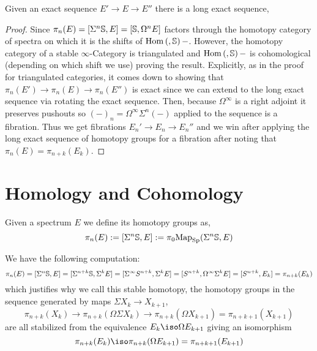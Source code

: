 \documentclass[12pt]{extarticle}
\begin{document}
\begin{prop}
Given an exact sequence $E' \to E \to E''$ there is a long exact sequence,
\begin{center}
\end{center} 
\end{prop}

\begin{proof}
Since $\pi_n(E) = [\Sigma^n \S, E] = [\S, \Omega^n E]$ factors through the homotopy category of spectra on which it is the shifts of $\Hom{}{\S}{-}$. However, the homotopy category of a stable $\infty$-Category is triangulated and $\Hom{}{\S}{-}$ is cohomological (depending on which shift we use) proving the result. Explicitly, as in the proof for triangulated categories, it comes down to showing that $\pi_n(E') \to \pi_n(E) \to \pi_n(E'')$ is exact since we can extend to the long exact sequence via rotating the exact sequence. Then, because $\Omega^\infty$ is a right adjoint it preserves pushouts so $(-)_n = \Omega^{\infty} \Sigma^n(-)$ applied to the sequence is a fibration. Thus we get fibrations $E_{n}' \to E_{n} \to E_{n}''$ and we win after applying the long exact sequence of homotopy groups for a fibration after noting that $\pi_n(E) = \pi_{n+k}(E_{k})$.
\end{proof}

\section{Homology and Cohomology}

\begin{defn}
Given a spectrum $E$ we define its homotopy groups as,
\[ \pi_n(E) := [\Sigma^n \S, E] := \pi_0 \mathrm{Map}_{\mathrm{Sp}}(\Sigma^n \S, E) \]
\end{defn}

\begin{rmk}
We have the following computation:
\[ \pi_n(E) = [\Sigma^n \S, E] = [\Sigma^{n+k} \S, \Sigma^k E] = [\Sigma^\infty S^{n+k}, \Sigma^k E] = [S^{n+k}, \Omega^\infty \Sigma^k E] = [S^{n+k}, E_k] = \pi_{n+k}(E_k) \]
which justifies why we call this stable homotopy, the homotopy groups in the sequence generated by maps $\Sigma X_k \to X_{k+1}$,
\[ \pi_{n+k}(X_k) \to \pi_{n+k}(\Omega \Sigma X_{k}) \to \pi_{n+k}(\Omega X_{k+1}) = \pi_{n+k+1}(X_{k+1}) \]
are all stabilized from the equivalence $E_{k} \iso \Omega E_{k+1}$ giving an isomorphism
\[ \pi_{n+k}(E_k) \iso \pi_{n+k}(\Omega E_{k+1}) = \pi_{n+k+1}(E_{k+1}) \]
\end{rmk}
\end{document}
